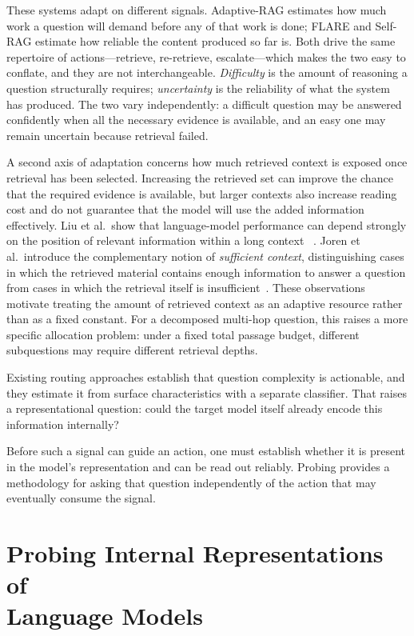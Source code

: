 These systems adapt on different signals. Adaptive-RAG estimates how much work
a question will demand before any of that work is done; FLARE and Self-RAG
estimate how reliable the content produced so far is. Both drive the same repertoire of actions---retrieve,
re-retrieve, escalate---which makes the two easy to conflate, and they are not
interchangeable. \emph{Difficulty} is the amount of reasoning a question structurally requires;
\emph{uncertainty} is the reliability of what the system has produced. The two
vary independently: a difficult question may be answered confidently when all
the necessary evidence is available, and an easy one may remain uncertain
because retrieval failed.

A second axis of adaptation concerns how much retrieved context is exposed once
retrieval has been selected. Increasing the retrieved set can improve the chance
that the required evidence is available, but larger contexts also increase
reading cost and do not guarantee that the model will use the added information
effectively. Liu et al.\ show that language-model performance can depend strongly
on the position of relevant information within a long context
~\cite{liu2024lost}. Joren et al.\ introduce the complementary notion of
\emph{sufficient context}, distinguishing cases in which the retrieved material
contains enough information to answer a question from cases in which the
retrieval itself is insufficient~\cite{joren2025sufficient}. These observations
motivate treating the amount of retrieved context as an adaptive resource rather
than as a fixed constant. For a decomposed multi-hop question, this raises a
more specific allocation problem: under a fixed total passage budget, different
subquestions may require different retrieval depths.

Existing routing approaches establish that question complexity is actionable,
and they estimate it from surface characteristics with a separate classifier.
That raises a representational question: could the target model itself already
encode this information internally?

Before such a signal can guide an action, one must establish whether it is
present in the model's representation and can be read out reliably. Probing
provides a methodology for asking that question independently of the action that
may eventually consume the signal.

\section[Probing Internal Representations of Language Models]
{Probing Internal Representations of\\Language Models}
\label{sec:probing-representations}

